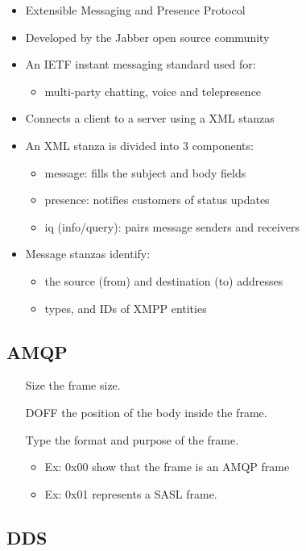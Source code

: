 \begin{itemize}
	\item Extensible Messaging and Presence Protocol
	\item Developed by the Jabber open source community
	\item An IETF instant messaging standard used for:
	\begin{itemize}
		\item multi-party chatting, voice and telepresence
	\end{itemize}
	\item Connects a client to a server using a XML stanzas
	\item An XML stanza is divided into 3 components:
	\begin{itemize}
		\item message: fills the subject and body fields
		\item presence: notifies customers of status updates
		\item iq (info/query): pairs message senders and receivers
	\end{itemize}
	\item Message stanzas identify:
	\begin{itemize}
		\item the source (from) and destination (to) addresses
		\item types, and IDs of XMPP entities
	\end{itemize}
\end{itemize}

\subsection{AMQP}

\begin{itemize}
	\item[Size] the frame size.
	\item[DOFF] the position of the body inside the frame.
	\item[Type] the format and purpose of the frame.
	\begin{itemize}
		\item Ex: 0x00 show that the frame is an AMQP frame
		\item Ex: 0x01 represents a SASL frame.
	\end{itemize}
\end{itemize}

\subsection{DDS}

